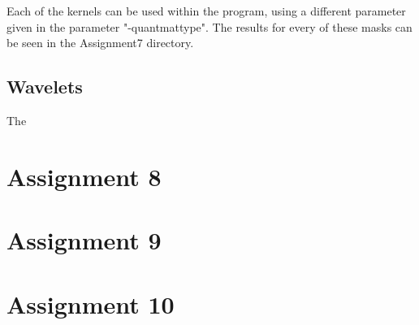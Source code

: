 Each of the kernels can be used within the program, using a different parameter given in the parameter "-quantmattype". The results for every of these masks can be seen in the Assignment7 directory.

\subsection{Wavelets}

The

\section{Assignment 8}

\section{Assignment 9}

\section{Assignment 10}